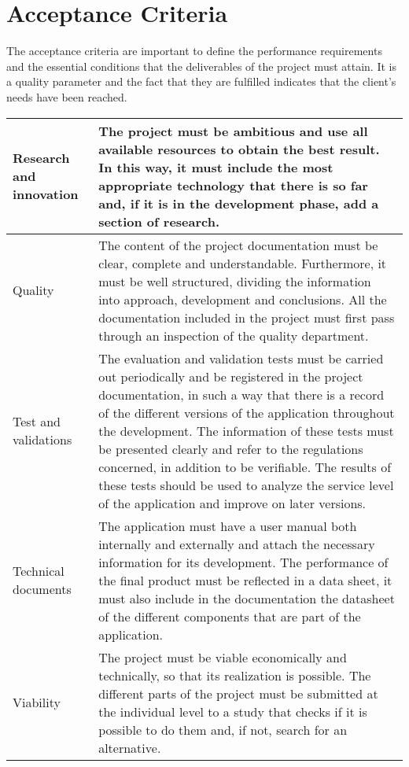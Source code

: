 \section{Acceptance Criteria}

The acceptance criteria are important to define the performance requirements and the essential conditions that the deliverables of the project must attain. It is a quality parameter and the fact that they are fulfilled indicates that the client's needs have been reached.

\begin{center}
	\begin{tabular}{|p{2cm}|p{10cm}|}
		\hline 
		Research and innovation & The project must be ambitious and use all available resources to obtain the best result. In this way, it must include the most appropriate technology that there is so far and, if it is in the development phase, add a section of research. 
		\\ 
		\hline 
		Quality & The content of the project documentation must be clear, complete and understandable. Furthermore, it must be well structured, dividing the information into approach, development and conclusions.
		All the documentation included in the project must first pass through an inspection of the quality department. 
		\\ 
		\hline 
		Test and validations & The evaluation and validation tests must be carried out periodically and be registered in the project documentation, in such a way that there is a record of the different versions of the application throughout the development.
		The information of these tests must be presented clearly and refer to the regulations concerned, in addition to be verifiable.
		The results of these tests should be used to analyze the service level of the application and improve on later versions.
		\\ 
		\hline 
		Technical documents & The application must have a user manual both internally and externally and attach the necessary information for its development.
		The performance of the final product must be reflected in a data sheet, it must also include in the documentation the datasheet of the different components that are part of the application.
		\\ 
		\hline
		Viability & The project must be viable economically and technically, so that its realization is possible.
		The different parts of the project must be submitted at the individual level to a study that checks if it is possible to do them and, if not, search for an alternative.

\end{tabular}
\end{center}
